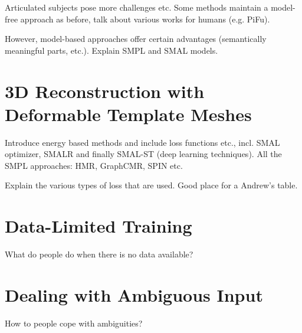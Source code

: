 Articulated subjects pose more challenges etc. Some methods maintain a model-free approach as before, talk about various works for humans (e.g. PiFu).

However, model-based approaches offer certain advantages (semantically meaningful parts, etc.). Explain SMPL and SMAL models.

\section[Template-Based]{3D Reconstruction with Deformable Template Meshes}

Introduce energy based methods and include loss functions etc., incl. SMAL optimizer, SMALR and finally SMAL-ST (deep learning techniques). All the SMPL approaches: HMR, GraphCMR, SPIN etc. 

Explain the various types of loss that are used. Good place for a Andrew's table.

\section{Data-Limited Training}

What do people do when there is no data available?

\section{Dealing with Ambiguous Input}

How to people cope with ambiguities?









